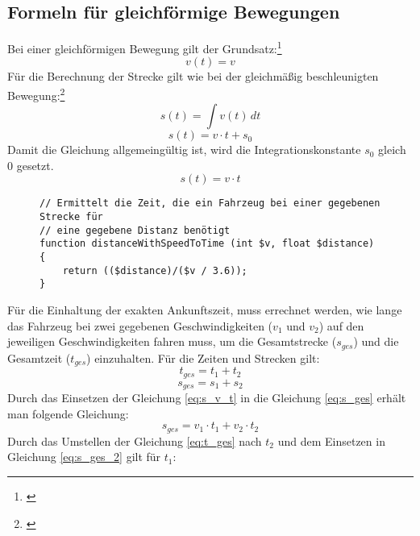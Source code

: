 \subsection{Formeln für gleichförmige Bewegungen} \label{formulaGleichfoermig}
Bei einer gleichförmigen Bewegung gilt der Grundsatz:\footnote{\citet[S. 22]{richard2011technische}}
\begin{equation}
v(t) = v
\end{equation}
Für die Berechnung der Strecke gilt wie bei der gleichmäßig beschleunigten Bewegung:\footnote{\citet[S. 20]{richard2011technische}}
\begin{equation}
s(t) = \int v(t) \,dt
\end{equation}
\begin{equation}
s(t) =v \cdot t + s_{0}
\end{equation}
Damit die Gleichung allgemeingültig ist, wird die Integrationskonstante $s_{0}$ gleich 0 gesetzt.
\begin{equation}
s(t) =v \cdot t
\label{eq:s_v_t}
\end{equation}
\begin{figure}[H]
\begin{lstlisting}[caption={\textit{distanceWithSpeedToTime$($$)$} (\textit{functions\_math.php})},captionpos=b,label={lst:distanceWithSpeedToTime}]
// Ermittelt die Zeit, die ein Fahrzeug bei einer gegebenen Strecke für
// eine gegebene Distanz benötigt
function distanceWithSpeedToTime (int $v, float $distance) {
	return (($distance)/($v / 3.6));
}
\end{lstlisting}
\end{figure}
\noindent Für die Einhaltung der exakten Ankunftszeit, muss errechnet werden, wie lange das Fahrzeug bei zwei gegebenen Geschwindigkeiten ($v_1$ und $v_2$) auf den jeweiligen Geschwindigkeiten fahren muss, um die Gesamtstrecke ($s_{ges}$) und die Gesamtzeit ($t_{ges}$) einzuhalten. Für die Zeiten und Strecken gilt:
\begin{equation}
\label{eq:t_ges}
t_{ges} = t_{1} + t_{2}
\end{equation}
\begin{equation}
\label{eq:s_ges}
s_{ges} = s_{1} + s_{2}
\end{equation}
Durch das Einsetzen der Gleichung \eqref{eq:s_v_t} in die Gleichung \eqref{eq:s_ges} erhält man folgende Gleichung:
\begin{equation}
\label{eq:s_ges_2}
s_{ges} = v_{1} \cdot t_{1} + v_{2} \cdot t_{2}
\end{equation}
Durch das Umstellen der Gleichung \eqref{eq:t_ges} nach $t_{2}$ und dem Einsetzen in Gleichung \eqref{eq:s_ges_2} gilt für $t_{1}$:

